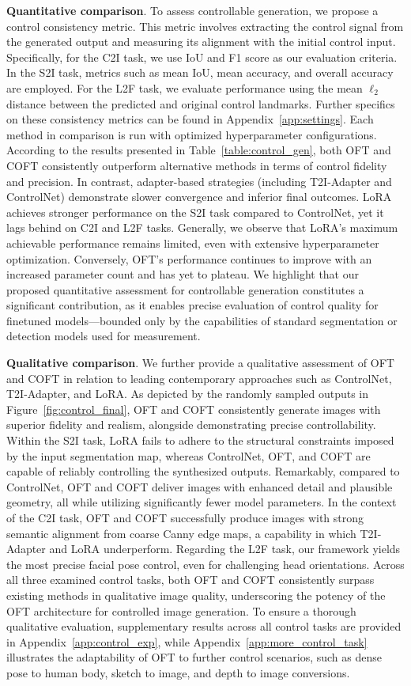 \textbf{Quantitative comparison}. To assess controllable generation, we propose a control consistency metric. This metric involves extracting the control signal from the generated output and measuring its alignment with the initial control input. Specifically, for the C2I task, we use IoU and F1 score as our evaluation criteria. In the S2I task, metrics such as mean IoU, mean accuracy, and overall accuracy are employed. For the L2F task, we evaluate performance using the mean $\ell_2$ distance between the predicted and original control landmarks. Further specifics on these consistency metrics can be found in Appendix~\ref{app:settings}. Each method in comparison is run with optimized hyperparameter configurations. According to the results presented in Table~\ref{table:control_gen}, both OFT and COFT consistently outperform alternative methods in terms of control fidelity and precision. In contrast, adapter-based strategies (including T2I-Adapter and ControlNet) demonstrate slower convergence and inferior final outcomes. LoRA achieves stronger performance on the S2I task compared to ControlNet, yet it lags behind on C2I and L2F tasks. Generally, we observe that LoRA's maximum achievable performance remains limited, even with extensive hyperparameter optimization. Conversely, OFT’s performance continues to improve with an increased parameter count and has yet to plateau. We highlight that our proposed quantitative assessment for controllable generation constitutes a significant contribution, as it enables precise evaluation of control quality for finetuned models—bounded only by the capabilities of standard segmentation or detection models used for measurement.

\textbf{Qualitative comparison}. We further provide a qualitative assessment of OFT and COFT in relation to leading contemporary approaches such as ControlNet, T2I-Adapter, and LoRA. As depicted by the randomly sampled outputs in Figure~\ref{fig:control_final}, OFT and COFT consistently generate images with superior fidelity and realism, alongside demonstrating precise controllability. Within the S2I task, LoRA fails to adhere to the structural constraints imposed by the input segmentation map, whereas ControlNet, OFT, and COFT are capable of reliably controlling the synthesized outputs. Remarkably, compared to ControlNet, OFT and COFT deliver images with enhanced detail and plausible geometry, all while utilizing significantly fewer model parameters. In the context of the C2I task, OFT and COFT successfully produce images with strong semantic alignment from coarse Canny edge maps, a capability in which T2I-Adapter and LoRA underperform. Regarding the L2F task, our framework yields the most precise facial pose control, even for challenging head orientations. Across all three examined control tasks, both OFT and COFT consistently surpass existing methods in qualitative image quality, underscoring the potency of the OFT architecture for controlled image generation. To ensure a thorough qualitative evaluation, supplementary results across all control tasks are provided in Appendix~\ref{app:control_exp}, while Appendix~\ref{app:more_control_task} illustrates the adaptability of OFT to further control scenarios, such as dense pose to human body, sketch to image, and depth to image conversions.

